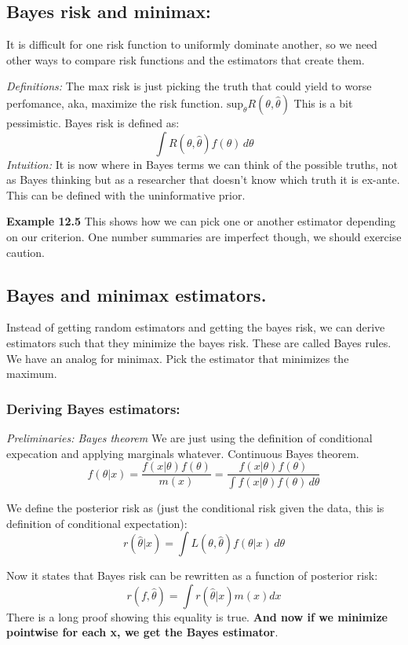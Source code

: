 \documentclass{article}
\begin{document}
\subsection{Bayes risk and minimax:}
It is difficult for one risk function to uniformly dominate another, so we need other ways to compare risk functions and the estimators that create them.

\textit{Definitions:}
The max risk is just picking the truth that could yield to worse perfomance, aka, maximize the risk function. $\textrm{sup}_\theta R(\theta,\hat{\theta})$ This is a 
bit pessimistic.
Bayes risk is defined as: $$ \int R(\theta,\hat{\theta}) f(\theta)\,d\theta  $$
\textit{Intuition:} It is now where in Bayes terms we can think of the possible truths, not as Bayes thinking but as a researcher that 
doesn't know which truth it is ex-ante. This can be defined with the uninformative prior. 

\textbf{Example 12.5}
This shows how we can pick one or another estimator depending on our criterion. One number summaries are imperfect though,
we should exercise caution. 

\subsection{Bayes and minimax estimators.}
Instead of getting random estimators and getting the bayes risk, we can derive estimators such that they minimize
the bayes risk. These are called Bayes rules. We have an analog for minimax. Pick the estimator 
that minimizes the maximum.

\subsubsection{Deriving Bayes estimators:}
\textit{Preliminaries: Bayes theorem}
We are just using the definition of conditional expecation and applying marginals whatever. Continuous Bayes theorem.
$$f(\theta|x) = \frac{f(x|\theta)f(\theta)}{m(x)} = \frac{f(x|\theta)f(\theta)}{\int f(x|\theta)f(\theta) \, d\theta }$$ 

We define the posterior risk as (just the conditional risk given the data, this is definition of conditional expectation): $$ r(\hat{\theta}| x) = \int L(\theta,\hat{\theta})f(\theta|x)\,d\theta $$

Now it states that Bayes risk can be rewritten as a function of posterior risk: $$r(f,\hat{\theta}) = \int r(\hat{\theta}|x) m(x) dx$$
There is a long proof showing this equality is true.
\textbf{And now if we minimize pointwise for each x, we get the Bayes estimator}.
\end{document}
